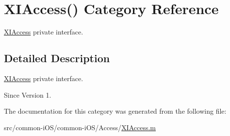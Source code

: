 \hypertarget{category_x_i_access_07_08}{}\section{X\+I\+Access() Category Reference}
\label{category_x_i_access_07_08}


\hyperlink{class_x_i_access}{X\+I\+Access} private interface.  




\subsection{Detailed Description}
\hyperlink{class_x_i_access}{X\+I\+Access} private interface. 

\begin{DoxySince}{Since}
Version 1. 
\end{DoxySince}


The documentation for this category was generated from the following file\+:\begin{DoxyCompactItemize}
\item 
src/common-\/i\+O\+S/common-\/i\+O\+S/\+Access/\hyperlink{_x_i_access_8m}{X\+I\+Access.\+m}\end{DoxyCompactItemize}
